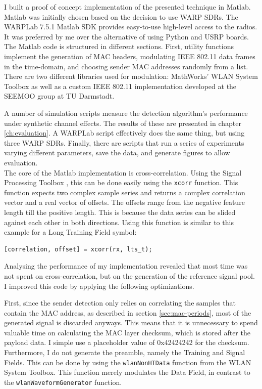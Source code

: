 I built a proof of concept implementation of the presented technique in Matlab. Matlab was initially chosen based on the decision to use \gls{WARP} \glspl{SDR}. The WARPLab 7.5.1 Matlab \gls{SDK} \cite{warplab} provides easy-to-use high-level access to the radios. It was preferred by me over the alternative of using Python and \gls{USRP} boards.\\

The Matlab code is structured in different sections. First, utility functions implement the generation of MAC headers, modulating IEEE 802.11 data frames in the time-domain, and choosing sender MAC addresses randomly from a list. There are two different libraries used for modulation: MathWorks' WLAN System Toolbox \cite{wlantoolbox} as well as a custom IEEE 802.11 implementation developed at the \gls{SEEMOO} group at TU Darmstadt.

A number of simulation scripts measure the detection algorithm's performance under synthetic channel effects. The results of these are presented in chapter \ref{ch:evaluation}. A WARPLab script effectively does the same thing, but using three \gls{WARP} \glspl{SDR}. Finally, there are scripts that run a series of experiments varying different parameters, save the data, and generate figures to allow evaluation.\\

The core of the Matlab implementation is cross-correlation. Using the Signal Processing Toolbox \cite{signaltoolbox}, this can be done easily using the \texttt{xcorr} function. This function expects two complex sample series and returns a complex correlation vector and a real vector of offsets. The offsets range from the negative feature length till the positive length. This is because the data series can be slided against each other in both directions. Using this function is similar to this example for a Long Training Field symbol:\\

\begin{lstlisting}[captionpos=b,caption={Cross-Correlation of LTF Symbol},label=lst:xcorr]
[correlation, offset] = xcorr(rx, lts_t);
\end{lstlisting}

Analysing the performance of my implementation revealed that most time was not spent on cross-correlation, but on the generation of the reference signal pool. I improved this code by applying the following optimizations.

First, since the sender detection only relies on correlating the samples that contain the MAC address, as described in section \ref{sec:mac-periods}, most of the generated signal is discarded anyways. This means that it is unnecessary to spend valuable time on calculating the MAC layer checksum, which is stored after the payload data. I simple use a placeholder value of 0x42424242 for the checksum. Furthermore, I do not generate the preamble, namely the Training and Signal Fields. This can be done by using the \texttt{wlanNonHTData} function from the WLAN System Toolbox. This function merely modulates the Data Field, in contrast to the \texttt{wlanWaveformGenerator} function.

